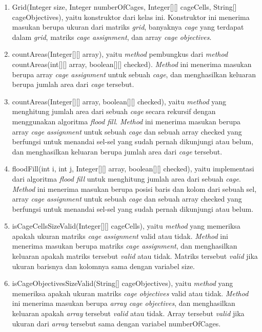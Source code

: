 \begin{enumerate}
\item Grid(Integer size, Integer numberOfCages, Integer[][] cageCells, String[] cageObjectives), yaitu konstruktor dari kelas ini. Konstruktor ini menerima masukan berupa ukuran dari matriks \textit{grid}, banyaknya \textit{cage} yang terdapat dalam \textit{grid}, matriks \textit{cage assignment}, dan array \textit{cage objectives}.
\item countAreas(Integer[][] array), yaitu \textit{method} pembungkus dari \textit{method} countAreas(int[][] array, boolean[][] checked). \textit{Method} ini menerima masukan berupa array \textit{cage assignment} untuk sebuah \textit{cage}, dan menghasilkan keluaran berupa jumlah area dari \textit{cage} tersebut.
\item countAreas(Integer[][] array, boolean[][] checked), yaitu \textit{method} yang menghitung jumlah area dari sebuah \textit{cage} secara rekursif dengan menggunakan algoritma \textit{flood fill}. \textit{Method} ini menerima masukan berupa array \textit{cage assignment} untuk sebuah \textit{cage} dan sebuah array checked yang berfungsi untuk menandai sel-sel yang sudah pernah dikunjungi atau belum, dan menghasilkan keluaran berupa jumlah area dari \textit{cage} tersebut.
\item floodFill(int i, int j, Integer[][] array, boolean[][] checked), yaitu implementasi dari algoritma \textit{flood fill} untuk menghitung jumlah area dari sebuah \textit{cage}. \textit{Method} ini menerima masukan berupa posisi baris dan kolom dari sebuah sel, array \textit{cage assignment} untuk sebuah \textit{cage} dan sebuah array checked yang berfungsi untuk menandai sel-sel yang sudah pernah dikunjungi atau belum.
\item isCageCellsSizeValid(Integer[][] cageCells), yaitu \textit{method} yang memeriksa apakah ukuran matriks \textit{cage assignment} valid atau tidak. \textit{Method} ini menerima masukan berupa matriks \textit{cage assignment}, dan menghasilkan keluaran apakah matriks tersebut \textit{valid} atau tidak. Matriks tersebut \textit{valid} jika ukuran barisnya dan kolomnya sama dengan variabel size.
\item isCageObjectivesSizeValid(String[] cageObjectives), yaitu \textit{method} yang memeriksa apakah ukuran matriks \textit{cage objectives} valid atau tidak. \textit{Method} ini menerima masukan berupa \textit{array cage objectives}, dan menghasilkan keluaran apakah \textit{array} tersebut \textit{valid} atau tidak. Array tersebut \textit{valid} jika ukuran dari \textit{array} tersebut sama dengan variabel numberOfCages.

\end{enumerate}
